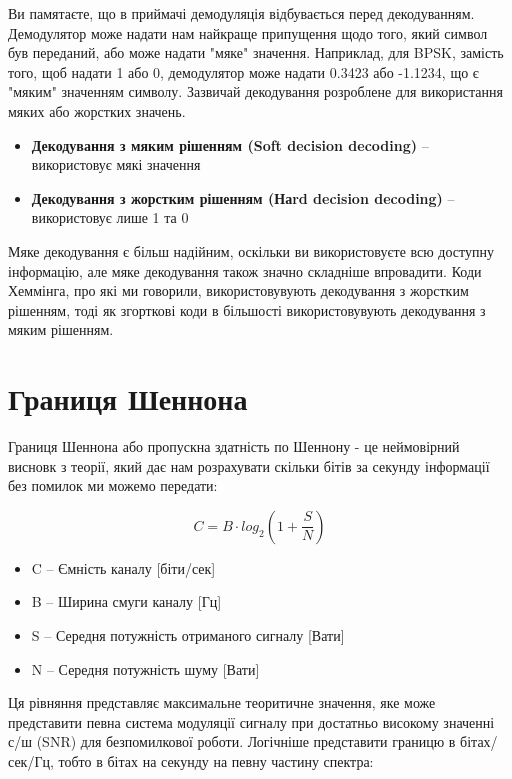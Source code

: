 Ви пам\textquotesingle ятаєте, що в приймачі демодуляція відбувається
перед декодуванням. Демодулятор може надати нам найкраще припущення щодо
того, який символ був переданий, або може надати "м\textquotesingle яке"
значення. Наприклад, для BPSK, замість того, щоб надати 1 або 0,
демодулятор може надати 0.3423 або -1.1234, що є
"м\textquotesingle яким" значенням символу. Зазвичай декодування
розроблене для використання м\textquotesingle яких або жорстких значень.

\begin{itemize}
\tightlist
\item
  \textbf{Декодування з м\textquotesingle яким рішенням (Soft decision
  decoding)} -- використовує м\textquotesingle які значення
\item
  \textbf{Декодування з жорстким рішенням (Наrd decision decoding)} --
  використовує лише 1 та 0
\end{itemize}

М\textquotesingle яке декодування є більш надійним, оскільки ви
використовуєте всю доступну інформацію, але м\textquotesingle яке
декодування також значно складніше впровадити. Коди Хеммінга, про які ми
говорили, використовувують декодування з жорстким рішенням, тоді як
згорткові коди в більшості використовувують декодування з
м\textquotesingle яким рішенням.

\section{Границя
Шеннона}\label{ux433ux440ux430ux43dux438ux446ux44f-ux448ux435ux43dux43dux43eux43dux430}

Границя Шеннона або пропускна здатність по Шеннону - це неймовірний
висновк з теорії, який дає нам розрахувати скільки бітів за секунду
інформації без помилок ми можемо передати:

\[C = B \cdot log_2 \left( 1 + \frac{S}{N}   \right)\]

\begin{itemize}
\tightlist
\item
  C -- Ємність каналу {[}біти/сек{]}
\item
  B -- Ширина смуги каналу {[}Гц{]}
\item
  S -- Середня потужність отриманого сигналу {[}Вати{]}
\item
  N -- Середня потужність шуму {[}Вати{]}
\end{itemize}

Ця рівняння представляє максимальне теоритичне значення, яке може
представити певна система модуляції сигналу при достатньо високому
значенні с/ш (SNR) для безпомилкової роботи. Логічніше представити
границю в бітах/сек/Гц, тобто в бітах на секунду на певну частину
спектра:

